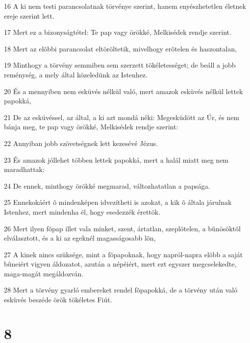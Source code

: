 \par 16 A ki nem testi parancsolatnak törvénye szerint, hanem enyészhetetlen életnek ereje szerint lett.
\par 17 Mert ez a bizonyságtétel: Te pap vagy örökké, Melkisédek rendje szerint.
\par 18 Mert az elõbbi parancsolat eltöröltetik, mivelhogy erõtelen és haszontalan,
\par 19 Minthogy a törvény semmiben sem szerzett tökéletességet; de beáll a jobb reménység,  a mely által közeledünk az Istenhez.
\par 20 És a mennyiben nem esküvés nélkül való, mert amazok esküvés nélkül lettek papokká,
\par 21 De az esküvéssel, az által, a ki azt mondá néki: Megesküdött az Úr, és nem bánja meg, te pap vagy örökké, Melkisédek rendje szerint:
\par 22 Annyiban jobb szövetségnek lett kezesévé Jézus.
\par 23 És amazok jóllehet többen lettek papokká, mert a halál miatt meg nem maradhattak:
\par 24 De ennek, minthogy örökké megmarad, változhatatlan a papsága.
\par 25 Ennekokáért õ mindenképen idvezítheti is azokat, a kik õ általa járulnak Istenhez, mert mindenha él, hogy esedezzék érettök.
\par 26 Mert ilyen fõpap illet vala minket, szent, ártatlan, szeplõtelen, a bûnösöktõl elválasztott, és a ki az egeknél magasságosabb lõn,
\par 27 A kinek nincs szüksége, mint a fõpapoknak, hogy napról-napra elõbb a saját bûneiért vigyen áldozatot, azután a népéiért, mert ezt egyszer megcselekedte, maga-magát megáldozván.
\par 28 Mert a törvény gyarló embereket rendel fõpapokká, de a törvény után való esküvés beszéde örök tökéletes Fiút.

\chapter{8}

